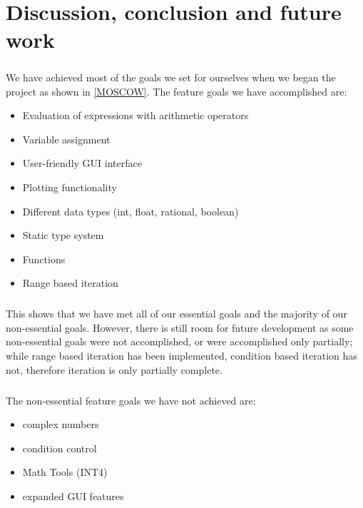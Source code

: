 \documentclass[a4paper, oneside, 11pt]{report}
\begin{document}
    \chapter{Discussion, conclusion and future work} \label{discussion}


    \paragraph{}
    We have achieved most of the goals we set for ourselves when we began the project as shown in \ref{MOSCOW}.
    The feature goals we have accomplished are:

    \begin{itemize}
        \item Evaluation of expressions with arithmetic operators
        \item Variable assignment
        \item User-friendly GUI interface
        \item Plotting functionality
        \item Different data types (int, float, rational, boolean)
        \item Static type system
        \item Functions
        \item Range based iteration
    \end{itemize}

    \paragraph{}
    This shows that we have met all of our essential goals and the majority of our non-essential goals.
    However, there is still room for future development as some non-essential goals were not accomplished, or were accomplished only partially; while range based iteration has been implemented, condition based iteration has not, therefore iteration is only partially complete.

    \paragraph{}
    The non-essential feature goals we have not achieved are:
    \begin{itemize}
        \item complex numbers
        \item condition control
        \item Math Tools (INT4)
        \item expanded GUI features
    \end{itemize}
\end{document}
